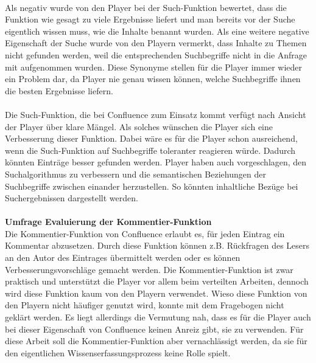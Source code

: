 \documentclass[a4paper,12pt,twoside]{scrartcl}
\begin{document}
\\
Als negativ wurde von den Player bei der Such-Funktion bewertet, dass die Funktion wie gesagt zu viele Ergebnisse liefert und man bereits vor der Suche eigentlich wissen muss, wie die Inhalte benannt wurden. Als eine weitere negative Eigenschaft der Suche wurde von den Playern vermerkt, dass Inhalte zu Themen nicht gefunden werden, weil die entsprechenden Suchbegriffe nicht in die Anfrage mit aufgenommen wurden. Diese Synonyme stellen für die Player immer wieder ein Problem dar, da Player nie genau wissen können, welche Suchbegriffe ihnen die besten Ergebnisse liefern. 
\\\\
Die Such-Funktion, die bei Confluence zum Einsatz kommt verfügt nach Ansicht der Player über klare Mängel. Als solches wünschen die Player sich eine Verbesserung dieser Funktion. Dabei wäre es für die Player schon ausreichend, wenn die Such-Funktion auf Suchbegriffe toleranter reagieren würde. Dadurch könnten Einträge besser gefunden werden. Player haben auch vorgeschlagen, den Suchalgorithmus zu verbessern und die semantischen Beziehungen der Suchbegriffe zwischen einander herzustellen. So könnten inhaltliche Bezüge bei Suchergebnissen dargestellt werden.
\\\\
\textbf{Umfrage Evaluierung der Kommentier-Funktion}\\
Die Kommentier-Funktion von Confluence erlaubt es, für jeden Eintrag ein Kommentar abzusetzen. Durch diese Funktion können z.B. Rückfragen des Lesers an den Autor des Eintrages übermittelt werden oder es können Verbesserungsvorschläge gemacht werden. Die Kommentier-Funktion ist zwar praktisch und unterstützt die Player vor allem beim verteilten Arbeiten, dennoch wird diese Funktion kaum von den Playern verwendet. Wieso diese Funktion von den Playern nicht häufiger genutzt wird, konnte mit dem Fragebogen nicht geklärt werden. Es liegt allerdings die Vermutung nah, dass es für die Player auch bei dieser Eigenschaft von Confluence keinen Anreiz gibt, sie zu verwenden. Für diese Arbeit soll die Kommentier-Funktion aber vernachlässigt werden, da sie für den eigentlichen Wissenserfassungsprozess keine Rolle spielt.
\end{document}
